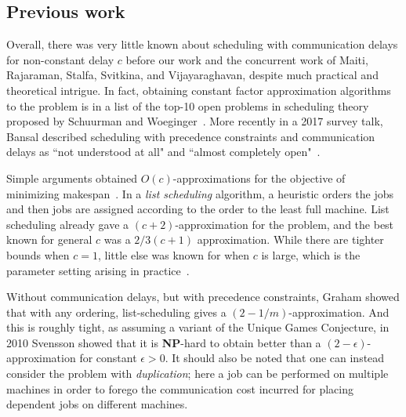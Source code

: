 \subsection{Previous work}

Overall, there was very little known about scheduling with communication delays for non-constant delay $c$ before our work and the concurrent work of Maiti, Rajaraman, 
Stalfa, Svitkina, and Vijayaraghavan\cite{MRSSV}, despite much practical and theoretical intrigue.
In fact, obtaining constant factor approximation algorithms to the problem is in a list of the top-10 open problems in scheduling theory 
proposed by Schuurman and Woeginger~\cite{SW99a}.
More recently in a 2017 survey talk, Bansal described scheduling with precedence constraints and communication delays 
as ``not understood at all" and ``almost completely open"~\cite{Bansalmapsp}.

Simple arguments obtained $O(c)$-approximations for the objective of minimizing makespan~\cite{GrahamListScheduling1966, GiroudeauKMP08}.
In a \emph{list scheduling} algorithm, a heuristic orders the jobs and then jobs are assigned according to the order to the least full machine.
List scheduling already gave a $(c+2)$-approximation for the problem, and the best known for general $c$ was a $2/3(c+1)$ approximation.
While there are tighter bounds when $c=1$, little else was known for when $c$ is large, which is the parameter setting arising in practice~\cite{MunierKonig, HanenMunier73Apx}.

Without communication delays, but with precedence constraints, Graham showed that with any ordering, list-scheduling gives a $(2-1/m)$-approximation.
And this is roughly tight, as assuming a variant of the Unique Games Conjecture, in 2010 Svensson showed that it is \textbf{NP}-hard to obtain better than a $(2-\epsilon)$-approximation 
for constant $\epsilon>0$.
It should also be noted that one can instead consider the problem with \emph{duplication}; here
a job can be performed on multiple machines in order to forego the communication cost incurred for placing dependent jobs on different machines.

